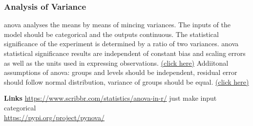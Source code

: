 \subsubsection{Analysis of Variance} %
\Gls{anova} analyses the means by means of mincing variances.
The inputs of the model should be categorical and the outputs continuous. 
The statistical significance of the experiment is determined by a ratio of two variances. 
\Gls{anova} statistical significance results are independent of constant bias and 
scaling errors as well as the units used in expressing observations. 
\href{https://en.wikipedia.org/wiki/Analysis_of_variance#Summary_of_assumptions}{(click here)}
Addiitonal assumptions of \gls{anova}: groups and levels should be independent, 
residual error should follow normal distribution, variance of groups should be equal. 
\href{https://statsandr.com/blog/anova-in-r/}{(click here)}

\textbf{Links}
\url{https://www.scribbr.com/statistics/anova-in-r/} just make input categorical\\
\url{https://pypi.org/project/pynova/}\\

